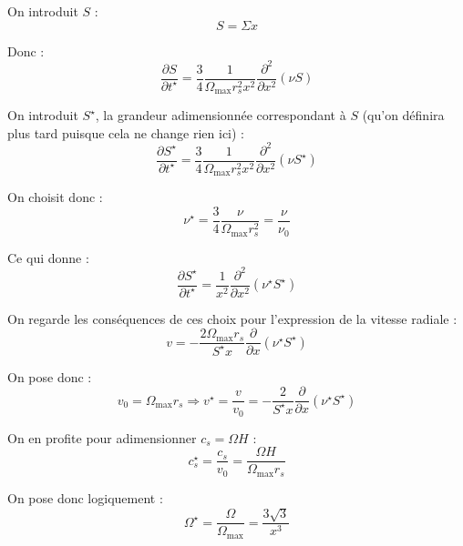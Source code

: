 On introduit $S$ :
\begin{equation}
    S = \Sigma x
\end{equation}

Donc :
\begin{equation}
    \frac{\partial S}{\partial t^\star} = \frac{3}{4} \frac{1}{\Omega_\mathrm{max} r_s^2 x^2} \frac{\partial^2}{\partial x^2} \left(\nu S\right)
\end{equation}

On introduit $S^\star$, la grandeur adimensionnée correspondant à $S$ (qu’on définira plus tard puisque cela ne change rien ici) :
\begin{equation}
    \frac{\partial S^\star}{\partial t^\star} = \frac{3}{4} \frac{1}{\Omega_\mathrm{max} r_s^2 x^2} \frac{\partial^2}{\partial x^2} \left(\nu S^\star\right)
\end{equation}

On choisit donc :
\begin{equation}
    \nu^\star = \frac{3}{4} \frac{\nu}{\Omega_\mathrm{max} r_s^2} = \frac{\nu}{\nu_0}
\end{equation}

Ce qui donne :
\begin{equation}
    \frac{\partial S^\star}{\partial t^\star} = \frac{1}{x^2} \frac{\partial^2}{\partial x^2} \left(\nu^\star S^\star\right)
\end{equation}

On regarde les conséquences de ces choix pour l’expression de la vitesse radiale :
\begin{equation}
    v = − \frac{2 \Omega_\mathrm{max} r_s}{S^\star x} \frac{\partial}{\partial x} \left(\nu^\star S^\star\right)
\end{equation}

On pose donc :
\begin{equation}
    v_0 = \Omega_\mathrm{max} r_s \Rightarrow v^\star = \frac{v}{v_0} = − \frac{2}{S^\star x} \frac{\partial}{\partial x} \left(\nu^\star S^\star\right)
\end{equation}

On en profite pour adimensionner $c_s = \Omega H$ :
\begin{equation}
    c_s^\star = \frac{c_s}{v_0} = \frac{\Omega H}{\Omega_\mathrm{max} r_s}
\end{equation}

On pose donc logiquement :
\begin{equation}
    \Omega^\star = \frac{\Omega}{\Omega_\mathrm{max}} = \frac{3\sqrt{3}}{x^3}
\end{equation}

